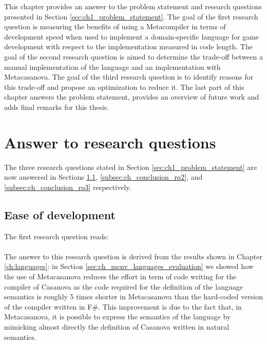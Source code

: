 This chapter provides an answer to the problem statement and research questions presented in Section \ref{sec:ch1_problem_statement}. The goal of the first research question is measuring the benefits of using a Metacompiler in terms of development speed when used to implement a domain-specific language for game development with respect to the implementation measured in code length. The goal of the second research question is aimed to determine the trade-off between a manual implementation of the language and an implementation with Metacasanova. The goal of the third research question is to identify reasons for this trade-off and propose an optimization to reduce it. The last part of this chapter answers the problem statement, provides an overview of future work and adds final remarks for this thesis.

\section{Answer to research questions}
\label{sec:ch_conclusion_answer_research_questions}
The three research questions stated in Section \ref{sec:ch1_problem_statement} are now answered  in Sections \ref{subsec:ch_conclusion_rq1}, \ref{subsec:ch_conclusion_rq2}, and \ref{subsec:ch_conclusion_rq3} respectively.

\subsection{Ease of development}
\label{subsec:ch_conclusion_rq1}

The first research question reads:\\

\\

The answer to this research question is derived from the results shown in Chapter \ref{ch:languages}: in Section \ref{sec:ch_mcnv_languages_evaluation} we showed how the use of Metacasanova reduces the effort in term of code writing for the compiler of Casanova as the code required for the definition of the language semantics is roughly 5 times shorter in Metacasanova than the hard-coded version of the compiler written in F\#. This improvement is due to the fact that, in Metacasanova, it is possible to express the semantics of the language by mimicking almost directly the definition of Casanova written in natural semantics. 

